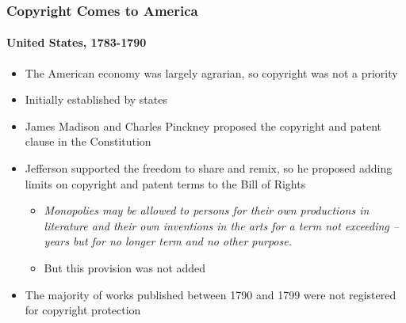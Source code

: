 
\begin{frame}
  \frametitle{Copyright Comes to America}
  \framesubtitle{United States, 1783-1790}

  \begin{itemize}
    \item The American economy was largely agrarian, so copyright was not a
    priority
    \item Initially established by states
    \item James Madison and Charles Pinckney proposed the copyright and patent
    clause in the Constitution
    \item Jefferson supported the freedom to share and remix, so he proposed
    adding limits on copyright and patent terms to the Bill of Rights
    \begin{itemize}
      \item \textit{Monopolies may be allowed to persons for their own productions
      in literature and their own inventions in the arts for a term not exceeding
      -- years but for no longer term and no other purpose.}
      \item But this provision was not added
    \end{itemize}
    \item The majority of works published between 1790 and 1799 were not
    registered for copyright protection
  \end{itemize}
\end{frame}

